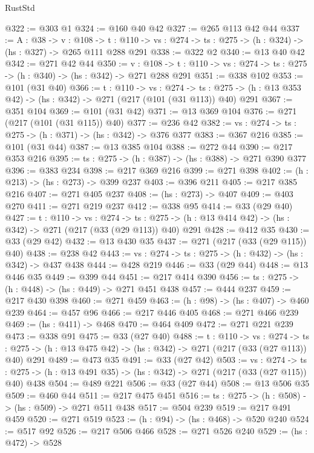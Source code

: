 \begin{lexlean}{RustStd}
\begin{coremodule}
@322 := @303 @1
@324 := @160 @40 @42
@327 := @265 @113 @42 @44
@337 := {A : @38} ->
  {v : @108} ->
  {t : @110} -> {vs : @274} -> {ts : @275} -> (h : @324) -> (hs : @327) -> @265 @111 @288 @291
@338 := @322 @2
@340 := @13 @40 @42
@342 := @271 @42 @44
@350 := {v : @108} ->
  {t : @110} -> {vs : @274} -> {ts : @275} -> (h : @340) -> (hs : @342) -> @271 @288 @291
@351 := @338 @102
@353 := @101 (@31 @40)
@366 := {t : @110} ->
  {vs : @274} ->
  {ts : @275} -> (h : @13 @353 @42) -> (hs : @342) -> @271 (@217 (@101 (@31 @113)) @40) @291
@367 := @351 @104
@369 := @101 (@31 @42)
@371 := @13 @369 @104
@376 := @271 (@217 (@101 (@31 @115)) @40)
@377 := @236 @42
@382 := {vs : @274} -> {ts : @275} -> (h : @371) -> (hs : @342) -> @376 @377
@383 := @367 @216
@385 := @101 (@31 @44)
@387 := @13 @385 @104
@388 := @272 @44
@390 := @217 @353 @216
@395 := {ts : @275} -> (h : @387) -> (hs : @388) -> @271 @390 @377
@396 := @383 @234
@398 := @217 @369 @216
@399 := @271 @398
@402 := (h : @213) -> (hs : @273) -> @399 @237
@403 := @396 @211
@405 := @217 @385 @216
@407 := @271 @405 @237
@408 := (hs : @273) -> @407
@409 := @403 @270
@411 := @271 @219 @237
@412 := @338 @95
@414 := @33 (@29 @40)
@427 := {t : @110} ->
  {vs : @274} ->
  {ts : @275} -> (h : @13 @414 @42) -> (hs : @342) -> @271 (@217 (@33 (@29 @113)) @40) @291
@428 := @412 @35
@430 := @33 (@29 @42)
@432 := @13 @430 @35
@437 := @271 (@217 (@33 (@29 @115)) @40)
@438 := @238 @42
@443 := {vs : @274} -> {ts : @275} -> (h : @432) -> (hs : @342) -> @437 @438
@444 := @428 @219
@446 := @33 (@29 @44)
@448 := @13 @446 @35
@449 := @399 @44
@451 := @217 @414 @390
@456 := {ts : @275} -> (h : @448) -> (hs : @449) -> @271 @451 @438
@457 := @444 @237
@459 := @217 @430 @398
@460 := @271 @459
@463 := (h : @98) -> (hs : @407) -> @460 @239
@464 := @457 @96
@466 := @217 @446 @405
@468 := @271 @466 @239
@469 := (hs : @411) -> @468
@470 := @464 @409
@472 := @271 @221 @239
@473 := @338 @91
@475 := @33 (@27 @40)
@488 := {t : @110} ->
  {vs : @274} ->
  {ts : @275} -> (h : @13 @475 @42) -> (hs : @342) -> @271 (@217 (@33 (@27 @113)) @40) @291
@489 := @473 @35
@491 := @33 (@27 @42)
@503 := {vs : @274} ->
  {ts : @275} -> (h : @13 @491 @35) -> (hs : @342) -> @271 (@217 (@33 (@27 @115)) @40) @438
@504 := @489 @221
@506 := @33 (@27 @44)
@508 := @13 @506 @35
@509 := @460 @44
@511 := @217 @475 @451
@516 := {ts : @275} -> (h : @508) -> (hs : @509) -> @271 @511 @438
@517 := @504 @239
@519 := @217 @491 @459
@520 := @271 @519
@523 := (h : @94) -> (hs : @468) -> @520 @240
@524 := @517 @92
@526 := @217 @506 @466
@528 := @271 @526 @240
@529 := (hs : @472) -> @528

\end{coremodule}
\end{lexlean}
